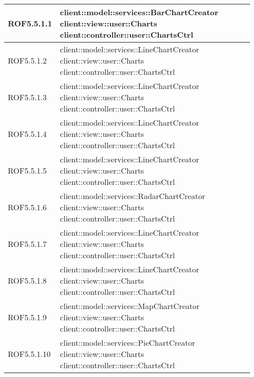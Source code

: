 \begin{center}
\begin{longtable}{| p{2.5cm} | p{11cm} |}
\hline
ROF5.5.1.1 & client::model::services::BarChartCreator \newline client::view::user::Charts \newline client::controller::user::ChartsCtrl \\
\hline
ROF5.5.1.2 & client::model::services::LineChartCreator \newline client::view::user::Charts \newline client::controller::user::ChartsCtrl \\
\hline
ROF5.5.1.3 & client::model::services::LineChartCreator \newline client::view::user::Charts \newline client::controller::user::ChartsCtrl \\
\hline
ROF5.5.1.4 & client::model::services::LineChartCreator \newline client::view::user::Charts \newline client::controller::user::ChartsCtrl \\
\hline
ROF5.5.1.5 & client::model::services::LineChartCreator \newline client::view::user::Charts \newline client::controller::user::ChartsCtrl \\
\hline
ROF5.5.1.6 & client::model::services::RadarChartCreator \newline client::view::user::Charts \newline client::controller::user::ChartsCtrl \\
\hline
ROF5.5.1.7 & client::model::services::LineChartCreator \newline client::view::user::Charts \newline client::controller::user::ChartsCtrl \\
\hline
ROF5.5.1.8 & client::model::services::LineChartCreator \newline client::view::user::Charts \newline client::controller::user::ChartsCtrl \\
\hline
ROF5.5.1.9 & client::model::services::MapChartCreator \newline client::view::user::Charts \newline client::controller::user::ChartsCtrl \\
\hline
ROF5.5.1.10 & client::model::services::PieChartCreator \newline client::view::user::Charts \newline client::controller::user::ChartsCtrl \\

\end{longtable}
\end{center}
